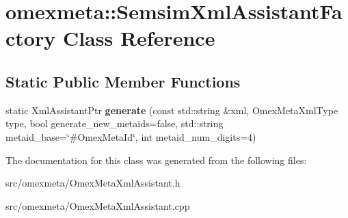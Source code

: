 \hypertarget{classomexmeta_1_1SemsimXmlAssistantFactory}{}\section{omexmeta\+:\+:Semsim\+Xml\+Assistant\+Factory Class Reference}
\label{classomexmeta_1_1SemsimXmlAssistantFactory}
\subsection*{Static Public Member Functions}
\begin{DoxyCompactItemize}
\item 
\mbox{\label{classomexmeta_1_1SemsimXmlAssistantFactory_acd1e70258ce2a70ff459f9ff905c2371}} 
static Xml\+Assistant\+Ptr {\bfseries generate} (const std\+::string \&xml, Omex\+Meta\+Xml\+Type type, bool generate\+\_\+new\+\_\+metaids=false, std\+::string metaid\+\_\+base=\char`\"{}\#Omex\+Meta\+Id\char`\"{}, int metaid\+\_\+num\+\_\+digits=4)
\end{DoxyCompactItemize}


The documentation for this class was generated from the following files\+:\begin{DoxyCompactItemize}
\item 
src/omexmeta/Omex\+Meta\+Xml\+Assistant.\+h\item 
src/omexmeta/Omex\+Meta\+Xml\+Assistant.\+cpp\end{DoxyCompactItemize}
